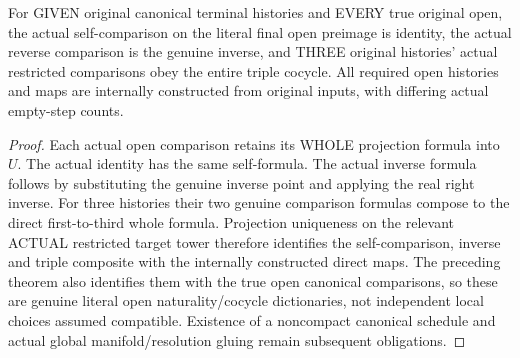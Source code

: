 \begin{theorem}
\label{hir:original-terminal-open-comparison-identity-inverse-cocycle}
\leanok
For GIVEN original canonical terminal histories and EVERY true original
open, the actual self-comparison on the literal final open preimage is
identity, the actual reverse comparison is the genuine inverse, and
THREE original histories' actual restricted comparisons obey the entire
triple cocycle. All required open histories and maps are internally
constructed from original inputs, with differing actual empty-step counts.
\end{theorem}
\begin{proof}
Each actual open comparison retains its WHOLE projection formula into $U$.
The actual identity has the same self-formula. The actual inverse formula
follows by substituting the genuine inverse point and applying the real
right inverse. For three histories their two genuine comparison formulas
compose to the direct first-to-third whole formula. Projection uniqueness
on the relevant ACTUAL restricted target tower therefore identifies the
self-comparison, inverse and triple composite with the internally
constructed direct maps. The preceding theorem also identifies them
with the true open canonical comparisons, so these are genuine literal
open naturality/cocycle dictionaries, not independent local choices
assumed compatible. Existence of a noncompact canonical schedule and
actual global manifold/resolution gluing remain subsequent obligations.
\end{proof}
